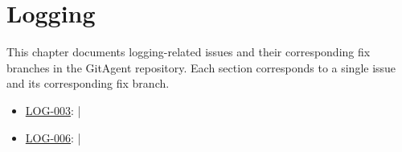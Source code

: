 \chapter{Logging}
\label{chap:log}

This chapter documents logging-related issues and their corresponding fix branches in the GitAgent repository. Each section corresponds to a single issue and its corresponding fix branch.

\begin{itemize}
    \item \hyperref[sec:log-003]{LOG-003}:  | 
    \item \hyperref[sec:log-006]{LOG-006}:  | 
\end{itemize}




